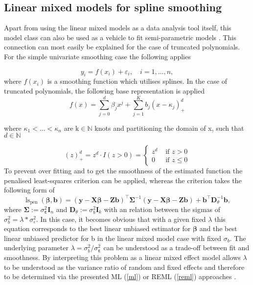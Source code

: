 \subsection{Linear mixed models for spline smoothing}
\label{chap:2.4.splinesmoothing}

Apart from using the linear mixed models as a data analysis tool itself, this model class can also be used as a vehicle to fit semi-parametric models \citep{ruppert2003semiparametric}. This connection can most easily be explained for the case of truncated polynomials. 
For the simple univariate smoothing case the following applies

\begin{equation*}
\label{specialcase2}
y_{i}=f\left(x_{i}\right)+\varepsilon_{i}, \quad i=1, \ldots, n,
\end{equation*}
where $f(x_{i})$ is a smoothing function which utilises splines. In the case of truncated polynomials, the following base representation is applied
\begin{equation*}
\label{approximation}
f(x)=\sum_{j=0}^{d} \beta_{j} x^{j}+\sum_{j=1}^{K} b_{j}\left(x-\kappa_{j}\right)_{+}^{d}
\end{equation*}

where $\kappa_{1}<\dots<\kappa_{n}$ are $\text{k} \in \mathbb{N}$ knots and partitioning the domain of x, such that $d \in \mathbb{N}$  

\begin{equation*} 
(z)_{+}^{d}=z^{d} \cdot I(z>0)=\left\{\begin{array}{ll}{z^{d}} & {\text { if } z>0} \\ {0} & {\text { if } z \leq 0}\end{array}\right .
\end{equation*}
To prevent over fitting and to get the smoothness of the estimated function the penalised least-squares criterion can be applied, whereas the criterion takes the following form of
\begin{equation*}
\operatorname{ls}_{\mathrm{pen}}( \boldsymbol \beta,  \boldsymbol{b})=( \boldsymbol {y}- \boldsymbol {X} { \boldsymbol \beta}- \boldsymbol {Z}  \boldsymbol {b})^{\top}  \boldsymbol {\Sigma}^{-1}( \boldsymbol {y}- \boldsymbol {X}  \boldsymbol {\beta}- \boldsymbol Z  \boldsymbol {b})+ \boldsymbol {b}^{\top}  \boldsymbol {D}_{\theta}^{-1}  \boldsymbol {b},
\end{equation*}
where $ \boldsymbol \Sigma:=\sigma^2_{ \boldsymbol \varepsilon}   \boldsymbol I_{n}$ and $ \boldsymbol D_{\theta}:= \sigma^{2}_{b}  \boldsymbol I_{k}$ with an relation between the sigmas of $\sigma^2_{b} = \lambda * \sigma^2_{\varepsilon}$. In this case, it becomes obvious that with a given fixed $\lambda$ this equation corresponds to the best linear unbiased estimator for $ \boldsymbol \beta$ and the best linear unbiased predictor for b in the linear mixed model case with fixed $\sigma_{b}$. The underlying parameter $\lambda = \sigma^2_{b} / \sigma^2_{ \boldsymbol \varepsilon}$ can be understood as a trade-off between fit and smoothness. By interpreting this problem as a linear mixed effect model allows $\lambda$ to be understood as the variance ratio of random and fixed effects and therefore to be determined via the presented ML (\ref{ml}) or REML (\ref{reml}) approaches \citep{ruppert2003semiparametric}. 
